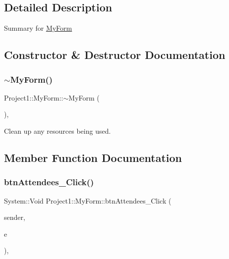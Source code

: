 \subsection{Detailed Description}
Summary for \mbox{\hyperlink{class_project1_1_1_my_form}{My\+Form}} 



\subsection{Constructor \& Destructor Documentation}
\mbox{\label{class_project1_1_1_my_form_a501b2b4481b72877fc73101f1d6f26be}} 
\subsubsection{\texorpdfstring{$\sim$\+My\+Form()}{~MyForm()}}
{\footnotesize\ttfamily Project1\+::\+My\+Form\+::$\sim$\+My\+Form (\begin{DoxyParamCaption}{ }\end{DoxyParamCaption})\hspace{0.3cm}{\ttfamily [inline]}, {\ttfamily [protected]}}



Clean up any resources being used. 



\subsection{Member Function Documentation}
\mbox{\label{class_project1_1_1_my_form_ac5ad7cd78f1d764ff9ed4405127e6f34}} 
\subsubsection{\texorpdfstring{btn\+Attendees\+\_\+\+Click()}{btnAttendees\_Click()}}
{\footnotesize\ttfamily System\+::\+Void Project1\+::\+My\+Form\+::btn\+Attendees\+\_\+\+Click (\begin{DoxyParamCaption}\item[{System\+::\+Object$^\wedge$}]{sender,  }\item[{System\+::\+Event\+Args$^\wedge$}]{e }\end{DoxyParamCaption})\hspace{0.3cm}{\ttfamily [inline]}, {\ttfamily [private]}}

